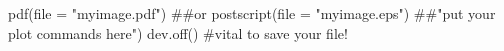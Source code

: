 \begin{Schunk}
\begin{Sinput}
 pdf(file = "myimage.pdf")
 ##or postscript(file = "myimage.eps")
 ##"put your plot commands here")
 dev.off()   #vital to save your file!
\end{Sinput}
\end{Schunk}
